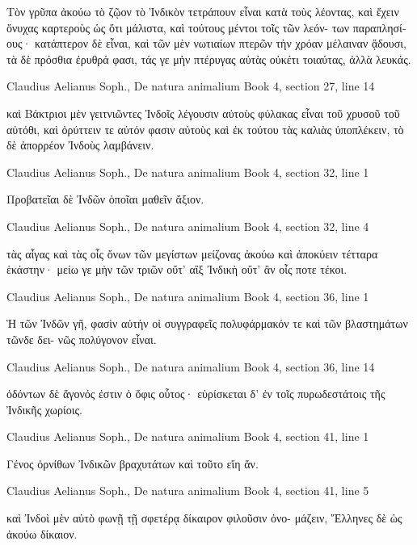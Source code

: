 \documentclass[12pt,letterpaper,twoside,final]{memoir}
\begin{document}
\begin{greek}
Τὸν γρῦπα ἀκούω τὸ ζῷον τὸ Ἰνδικὸν τετράπουν 
εἶναι κατὰ τοὺς λέοντας, καὶ ἔχειν ὄνυχας καρτεροὺς 
ὡς ὅτι μάλιστα, καὶ τούτους μέντοι τοῖς τῶν λεόν-
των παραπλησίους· κατάπτερον δὲ εἶναι, καὶ τῶν 
μὲν νωτιαίων πτερῶν τὴν χρόαν μέλαιναν ᾄδουσι,   
τὰ δὲ πρόσθια ἐρυθρά φασι, τάς γε μὴν πτέρυγας 
αὐτὰς οὐκέτι τοιαύτας, ἀλλὰ λευκάς. 



Claudius Aelianus Soph., De natura animalium 
Book 4, section 27, line 14

                                            καὶ Βάκτριοι 
μὲν γειτνιῶντες Ἰνδοῖς λέγουσιν αὐτοὺς φύλακας 
εἶναι τοῦ χρυσοῦ τοῦ αὐτόθι, καὶ ὀρύττειν τε αὐτόν 
φασιν αὐτοὺς καὶ ἐκ τούτου τὰς καλιὰς ὑποπλέκειν, 
τὸ δὲ ἀπορρέον Ἰνδοὺς λαμβάνειν. 



Claudius Aelianus Soph., De natura animalium 
Book 4, section 32, line 1

Προβατεῖαι δὲ Ἰνδῶν ὁποῖαι μαθεῖν ἄξιον. 



Claudius Aelianus Soph., De natura animalium 
Book 4, section 32, line 4

                                                     τὰς 
αἶγας καὶ τὰς οἶς ὄνων τῶν μεγίστων μείζονας ἀκούω 
καὶ ἀποκύειν τέτταρα ἑκάστην· μείω γε μὴν τῶν 
τριῶν οὔτ' αἲξ Ἰνδικὴ οὔτ' ἂν οἶς ποτε τέκοι. 



Claudius Aelianus Soph., De natura animalium 
Book 4, section 36, line 1

Ἡ τῶν Ἰνδῶν γῆ, φασὶν αὐτὴν οἱ συγγραφεῖς 
πολυφάρμακόν τε καὶ τῶν βλαστημάτων τῶνδε δει-
νῶς πολύγονον εἶναι. 



Claudius Aelianus Soph., De natura animalium 
Book 4, section 36, line 14

                                               ὀδόντων 
δὲ ἄγονός ἐστιν ὁ ὄφις οὗτος· εὑρίσκεται δ' ἐν 
τοῖς πυρωδεστάτοις τῆς Ἰνδικῆς χωρίοις. 



Claudius Aelianus Soph., De natura animalium 
Book 4, section 41, line 1

Γένος ὀρνίθων Ἰνδικῶν βραχυτάτων καὶ τοῦτο 
εἴη ἄν. 



Claudius Aelianus Soph., De natura animalium 
Book 4, section 41, line 5

                                            καὶ Ἰνδοὶ 
μὲν αὐτὸ φωνῇ τῇ σφετέρᾳ δίκαιρον φιλοῦσιν ὀνο-
μάζειν, Ἕλληνες δὲ ὡς ἀκούω δίκαιον. 




\end{greek}
\end{document}
